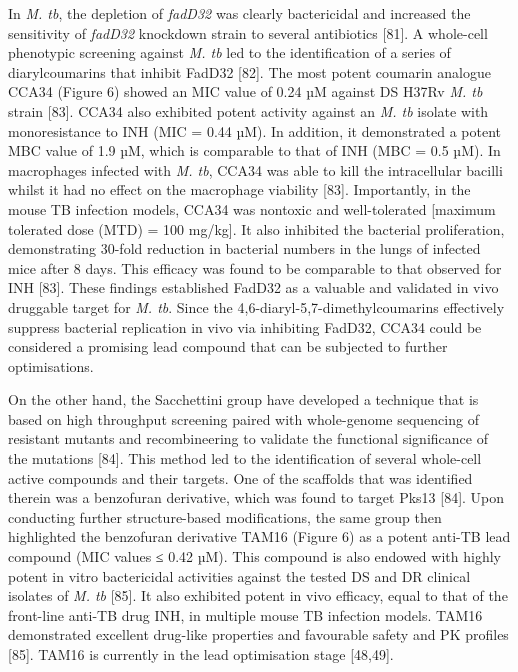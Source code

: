 \documentclass{article}
\begin{document}
In \textit{M. tb}, the depletion of \textit{fadD32} was clearly bactericidal and increased the sensitivity of \textit{fadD32} knockdown strain to several antibiotics [81]. A whole-cell phenotypic screening against \textit{M. tb} led to the identification of a series of diarylcoumarins that inhibit FadD32 [82]. The most potent coumarin analogue CCA34 (Figure 6) showed an MIC value of 0.24 µM against DS H37Rv \textit{M. tb} strain [83]. CCA34 also exhibited potent activity against an \textit{M. tb} isolate with monoresistance to INH (MIC = 0.44 µM). In addition, it demonstrated a potent MBC value of 1.9 µM, which is comparable to that of INH (MBC = 0.5 µM). In macrophages infected with \textit{M. tb}, CCA34 was able to kill the intracellular bacilli whilst it had no effect on the macrophage viability [83]. Importantly, in the mouse TB infection models, CCA34 was nontoxic and well-tolerated [maximum tolerated dose (MTD) = 100 mg/kg]. It also inhibited the bacterial proliferation, demonstrating 30-fold reduction in bacterial numbers in the lungs of infected mice after 8 days. This efficacy was found to be comparable to that observed for INH [83]. These findings established FadD32 as a valuable and validated in vivo druggable target for \textit{M. tb}. Since the 4,6-diaryl-5,7-dimethylcoumarins effectively suppress bacterial replication in vivo via inhibiting FadD32, CCA34 could be considered a promising lead compound that can be subjected to further optimisations.

On the other hand, the Sacchettini group have developed a technique that is based on high throughput screening paired with whole-genome sequencing of resistant mutants and recombineering to validate the functional significance of the mutations [84]. This method led to the identification of several whole-cell active compounds and their targets. One of the scaffolds that was identified therein was a benzofuran derivative, which was found to target Pks13 [84]. Upon conducting further structure-based modifications, the same group then highlighted the benzofuran derivative TAM16 (Figure 6) as a potent anti-TB lead compound (MIC values ≤ 0.42 µM). This compound is also endowed with highly potent in vitro bactericidal activities against the tested DS and DR clinical isolates of \textit{M. tb} [85]. It also exhibited potent in vivo efficacy, equal to that of the front-line anti-TB drug INH, in multiple mouse TB infection models. TAM16 demonstrated excellent drug-like properties and favourable safety and PK profiles [85]. TAM16 is currently in the lead optimisation stage [48,49].
\end{document}
